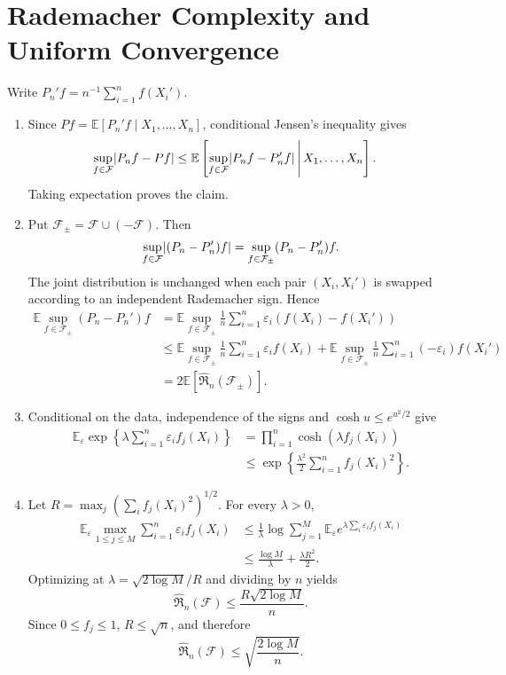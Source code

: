 \documentclass[11pt]{article}
\newcommand{\bbE}{\mathbb{E}}
\DeclarePairedDelimiter{\abs}{\lvert}{\rvert}
\begin{document}
\section{Rademacher Complexity and Uniform Convergence}

Write $P_n'f=n^{-1}\sum_{i=1}^nf(X_i')$.

\begin{enumerate}
\item Since $Pf=\bbE[P_n'f\mid X_1,\ldots,X_n]$, conditional Jensen's
inequality gives
\[
\begin{aligned}
\sup_{f\in\mathcal F}\abs{P_nf-Pf}
&\leq
\bbE\left[
\sup_{f\in\mathcal F}\abs{P_nf-P_n'f}
\,\middle|\,X_1,\ldots,X_n
\right].
\end{aligned}
\]
Taking expectation proves the claim.

\item Put $\mathcal F_{\pm}=\mathcal F\cup(-\mathcal F)$. Then
\[
\sup_{f\in\mathcal F}\abs{(P_n-P_n')f}
=\sup_{f\in\mathcal F_{\pm}}(P_n-P_n')f.
\]
The joint distribution is unchanged when each pair $(X_i,X_i')$ is
swapped according to an independent Rademacher sign. Hence
\[
\begin{aligned}
\bbE\sup_{f\in\mathcal F_{\pm}}(P_n-P_n')f
&=\bbE\sup_{f\in\mathcal F_{\pm}}
\frac1n\sum_{i=1}^n\varepsilon_i(f(X_i)-f(X_i'))\\
&\leq
\bbE\sup_{f\in\mathcal F_{\pm}}\frac1n\sum_{i=1}^n\varepsilon_if(X_i)
+\bbE\sup_{f\in\mathcal F_{\pm}}\frac1n\sum_{i=1}^n(-\varepsilon_i)f(X_i')\\
&=2\bbE[\widehat{\mathfrak R}_n(\mathcal F_{\pm})].
\end{aligned}
\]

\item Conditional on the data, independence of the signs and
$\cosh u\leq e^{u^2/2}$ give
\[
\begin{aligned}
\bbE_\varepsilon\exp\left\{
\lambda\sum_{i=1}^n\varepsilon_if_j(X_i)\right\}
&=\prod_{i=1}^n\cosh(\lambda f_j(X_i))\\
&\leq\exp\left\{\frac{\lambda^2}{2}
\sum_{i=1}^nf_j(X_i)^2\right\}.
\end{aligned}
\]

\item Let
$R=\max_j(\sum_i f_j(X_i)^2)^{1/2}$. For every $\lambda>0$,
\[
\begin{aligned}
\bbE_\varepsilon\max_{1\leq j\leq M}
\sum_{i=1}^n\varepsilon_if_j(X_i)
&\leq\frac1\lambda
\log\sum_{j=1}^M
\bbE_\varepsilon e^{\lambda\sum_i\varepsilon_if_j(X_i)}\\
&\leq\frac{\log M}{\lambda}+\frac{\lambda R^2}{2}.
\end{aligned}
\]
Optimizing at $\lambda=\sqrt{2\log M}/R$ and dividing by $n$ yields
\[
\widehat{\mathfrak R}_n(\mathcal F)
\leq\frac{R\sqrt{2\log M}}{n}.
\]
Since $0\leq f_j\leq1$, $R\leq\sqrt n$, and therefore
\[
\widehat{\mathfrak R}_n(\mathcal F)
\leq\sqrt{\frac{2\log M}{n}}.
\]


\end{enumerate}
\end{document}
